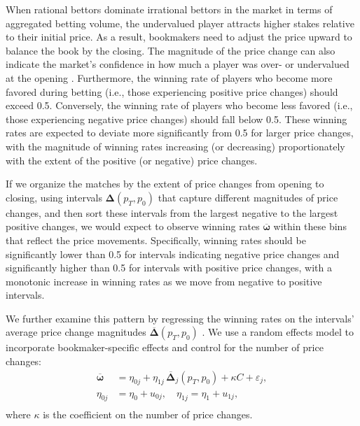 \documentclass[webpdf,modern,medium]{oup-authoring-template}
\newcommand{\bs}{\boldsymbol}
\theoremstyle{thmstyleone}%
\theoremstyle{thmstyletwo}%
\theoremstyle{thmstylethree}%
\begin{document}
        When rational bettors dominate irrational bettors in the market in terms of aggregated betting volume, the undervalued player attracts higher stakes relative to their initial price. As a result, bookmakers need to adjust the price upward to balance the book by the closing. The magnitude of the price change can also indicate the market's confidence in how much a player was over- or undervalued at the opening \citep{gandar1998}.
        Furthermore, the winning rate of players who become more favored during betting (i.e., those experiencing positive price changes) should exceed 0.5. Conversely, the winning rate of players who become less favored (i.e., those experiencing negative price changes) should fall below 0.5. These winning rates are expected to deviate more significantly from 0.5 for larger price changes, with the magnitude of winning rates increasing (or decreasing) proportionately with the extent of the positive (or negative) price changes.

        If we organize the matches by the extent of price changes from opening to closing, using intervals $\bs{\Delta}(p_T, p_0)$ that capture different magnitudes of price changes, and then sort these intervals from the largest negative to the largest positive changes, we would expect to observe winning rates $\overline{\bs{\omega}}$ within these bins that reflect the price movements. Specifically, winning rates should be significantly lower than 0.5 for intervals indicating negative price changes and significantly higher than 0.5 for intervals with positive price changes, with a monotonic increase in winning rates as we move from negative to positive intervals.

        We further examine this pattern by regressing the winning rates on the intervals' average price change magnitudes $\overline{\bs{\Delta}}(p_T, p_0)$ \citep{gandar1998}. We use a random effects model to incorporate bookmaker-specific effects and control for the number of price changes:
        \begin{equation}
            \begin{split}
                \overline{\bs{\omega}} &= \eta_{0j} + \eta_{1j} \, \overline{\bs{\Delta}}_j(p_T, p_0) + \kappa C + \varepsilon_j, \\
                \eta_{0j} &= \eta_{0} + u_{0j}, \quad \eta_{1j} = \eta_{1} + u_{1j},\\
            \end{split}
            \label{eq:win_rates}
        \end{equation}
        where $\kappa$ is the coefficient on the number of price changes.
\end{document}
